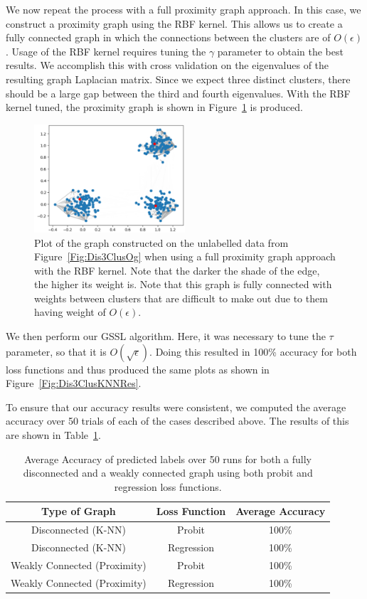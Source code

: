 \documentclass[12pt]{amsart}
\begin{document}
We now repeat the process with a full proximity graph approach. In this case, we construct a proximity graph using the RBF kernel. This allows us to create a fully connected graph in which the connections between the clusters are of $O(\epsilon)$. Usage of the RBF kernel requires tuning the $\gamma$ parameter to obtain the best results. We accomplish this with cross validation on the eigenvalues of the resulting graph Laplacian matrix. Since we expect three distinct clusters, there should be a large gap between the third and fourth eigenvalues. With the RBF kernel tuned, the proximity graph is shown in Figure~\ref{Fig:Dis3ClusProx} is produced.
\begin{figure}
    \centering
    \includegraphics[width=0.5\textwidth]{Figures/Dis3ClusProx.png}
    \caption{
        Plot of the graph constructed on the unlabelled data from Figure~\ref{Fig:Dis3ClusOg} when using a full proximity graph approach with the RBF kernel. Note that the darker the shade of the edge, the higher its weight is. Note that this graph is fully connected with weights between clusters that are difficult to make out due to them having weight of $O(\epsilon)$.
    }
	\label{Fig:Dis3ClusProx}
\end{figure}

We then perform our GSSL algorithm. Here, it was necessary to tune the $\tau$ parameter, so that it is $O(\sqrt{\epsilon})$. Doing this resulted in 100\% accuracy for both loss functions and thus produced the same plots as shown in Figure~\ref{Fig:Dis3ClusKNNRes}.

To ensure that our accuracy results were consistent, we computed the average accuracy over 50 trials of each of the cases described above. The results of this are shown in Table~\ref{Table:3ClusRes}.
\begin{table}
\begin{center}
\begin{tabular}{||c c c||} 
 \hline
 Type of Graph & Loss Function & Average Accuracy\\  
 \hline\hline
 Disconnected (K-NN) & Probit & 100\% \\ 
 \hline
 Disconnected (K-NN) & Regression & 100\% \\
 \hline
 Weakly Connected (Proximity) & Probit & 100\% \\
 \hline
 Weakly Connected (Proximity) & Regression & 100\% \\ 
 \hline
\end{tabular}
\caption{Average Accuracy of predicted labels over 50 runs for both a fully disconnected and a weakly connected graph using both probit and regression loss functions.}
\label{Table:3ClusRes}
\end{center}
\end{table}
\end{document}
